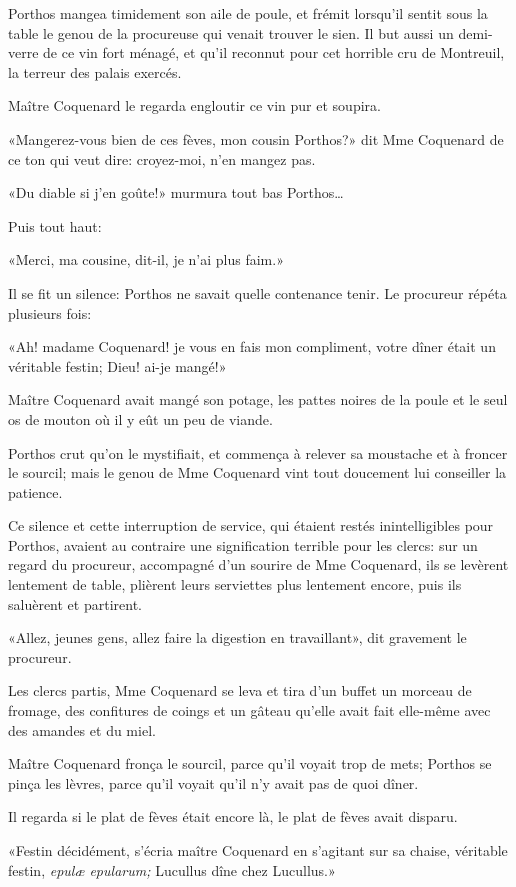 Porthos mangea timidement son aile de poule, et frémit lorsqu'il sentit sous la table le genou de la procureuse qui venait trouver le sien. Il but aussi un demi-verre de ce vin fort ménagé, et qu'il reconnut pour cet horrible cru de Montreuil, la terreur des palais exercés. 

Maître Coquenard le regarda engloutir ce vin pur et soupira. 

«Mangerez-vous bien de ces fèves, mon cousin Porthos?» dit Mme Coquenard de ce ton qui veut dire: croyez-moi, n'en mangez pas. 

«Du diable si j'en goûte!» murmura tout bas Porthos\dots 

Puis tout haut: 

«Merci, ma cousine, dit-il, je n'ai plus faim.» 

Il se fit un silence: Porthos ne savait quelle contenance tenir. Le procureur répéta plusieurs fois: 

«Ah! madame Coquenard! je vous en fais mon compliment, votre dîner était un véritable festin; Dieu! ai-je mangé!» 

Maître Coquenard avait mangé son potage, les pattes noires de la poule et le seul os de mouton où il y eût un peu de viande. 

Porthos crut qu'on le mystifiait, et commença à relever sa moustache et à froncer le sourcil; mais le genou de Mme Coquenard vint tout doucement lui conseiller la patience. 

Ce silence et cette interruption de service, qui étaient restés inintelligibles pour Porthos, avaient au contraire une signification terrible pour les clercs: sur un regard du procureur, accompagné d'un sourire de Mme Coquenard, ils se levèrent lentement de table, plièrent leurs serviettes plus lentement encore, puis ils saluèrent et partirent. 

«Allez, jeunes gens, allez faire la digestion en travaillant», dit gravement le procureur. 

Les clercs partis, Mme Coquenard se leva et tira d'un buffet un morceau de fromage, des confitures de coings et un gâteau qu'elle avait fait elle-même avec des amandes et du miel. 

Maître Coquenard fronça le sourcil, parce qu'il voyait trop de mets; Porthos se pinça les lèvres, parce qu'il voyait qu'il n'y avait pas de quoi dîner. 

Il regarda si le plat de fèves était encore là, le plat de fèves avait disparu. 

«Festin décidément, s'écria maître Coquenard en s'agitant sur sa chaise, véritable festin, \textit{epulæ epularum;} Lucullus dîne chez Lucullus.» 


